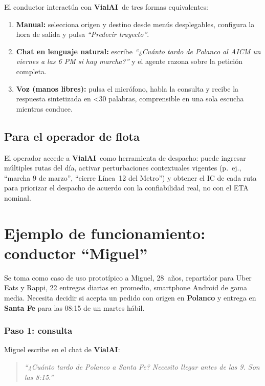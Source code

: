 \documentclass[11pt,a4paper]{article}
\newcommand{\VialAI}{\textbf{\textcolor{vialTeal}{Vial}\textcolor{vialAmber}{AI}}}
\begin{document}
El conductor interactúa con \VialAI\ de tres formas equivalentes:

\begin{enumerate}
\item \textbf{Manual:} selecciona origen y destino desde menús
desplegables, configura la hora de salida y pulsa
\emph{``Predecir trayecto''}.
\item \textbf{Chat en lenguaje natural:} escribe
\emph{``¿Cuánto tardo de Polanco al AICM un viernes a las 6 PM
si hay marcha?''} y el agente razona sobre la petición completa.
\item \textbf{Voz (manos libres):} pulsa el micrófono, habla la
consulta y recibe la respuesta sintetizada en
\textless 30 palabras, comprensible en una sola escucha mientras
conduce.
\end{enumerate}

\subsection{Para el operador de flota}

El operador accede a \VialAI\ como herramienta de despacho:
puede ingresar múltiples rutas del día, activar perturbaciones
contextuales vigentes (p.~ej., ``marcha 9 de marzo'', ``cierre Línea~12
del Metro'') y obtener el IC de cada ruta para priorizar el despacho
de acuerdo con la confiabilidad real, no con el ETA nominal.

\section{Ejemplo de funcionamiento: conductor ``Miguel''}

Se toma como caso de uso prototípico a Miguel, \num{28}~años,
repartidor para Uber Eats y Rappi, \num{22} entregas diarias en
promedio, smartphone Android de gama media. Necesita decidir si acepta
un pedido con origen en \textbf{Polanco} y entrega en
\textbf{Santa Fe} para las 08:15 de un martes hábil.

\subsubsection{Paso 1: consulta}

Miguel escribe en el chat de \VialAI:

\begin{quote}
\itshape ``¿Cuánto tardo de Polanco a Santa Fe? Necesito llegar antes
de las 9. Son las 8:15.''
\end{quote}
\end{document}
